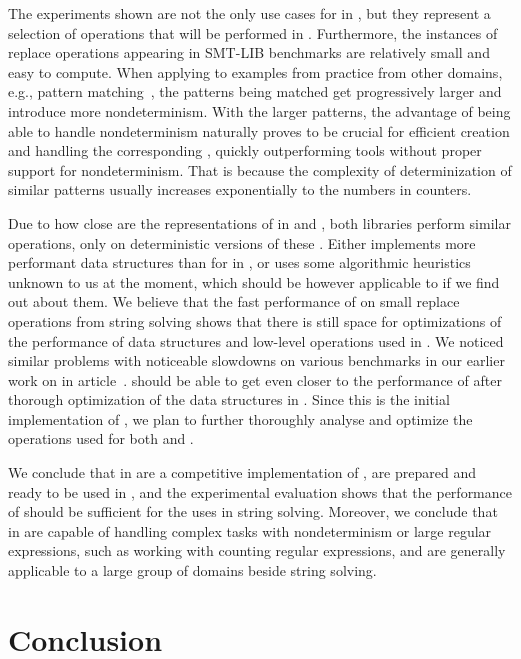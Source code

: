The experiments shown are not the only use cases for \nfts in \mata, but they represent a selection of operations that will be performed in \noodler.
Furthermore, the instances of replace operations appearing in SMT-LIB benchmarks are relatively small and easy to compute.
When applying \nfts to examples from practice from other domains, e.g., pattern matching~\cite{10.1007/978-3-031-30829-1_19}, the patterns being matched get progressively larger and introduce more nondeterminism.
With the larger patterns, the advantage of \mata being able to handle nondeterminism naturally proves to be crucial for efficient creation and handling the corresponding \nfts, quickly outperforming tools without proper support for nondeterminism.
That is because the complexity of determinization of similar patterns usually increases exponentially to the numbers in counters.

Due to how close are the representations of \nfts in \mata and \mona, both libraries perform similar operations, only \mona on deterministic versions of these \nfts.
Either \mona implements more performant data structures than \deltastruct for \nfas in \mata, or \mona uses some algorithmic heuristics unknown to us at the moment, which should be however applicable to \mata if we find out about them.
We believe that the fast performance of \mona on small replace operations from string solving shows that there is still space for optimizations of the performance of data structures and low-level operations used in \mata.
We noticed similar problems with noticeable slowdowns on various \nfa benchmarks in our earlier work on \mata in article~\cite{tacas24_mata_10.1007/978-3-031-57249-4_7}.
\mata should be able to get even closer to the performance of \mona after thorough optimization of the data structures in \mata.
Since this is the initial implementation of \nfts, we plan to further thoroughly analyse and optimize the operations used for both \nfas and \nfts.

We conclude that \nfts in \mata are a competitive implementation of \nfts, are prepared and ready to be used in \noodler, and the experimental evaluation shows that the performance of \mata should be sufficient for the uses in string solving.
Moreover, we conclude that \nfts in \mata are capable of handling complex tasks with nondeterminism or large regular expressions, such as working with counting regular expressions, and are generally applicable to a large group of domains beside string solving.

\chapter{Conclusion}

